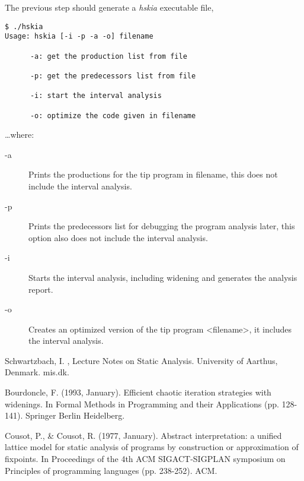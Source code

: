 \documentclass{article}
\begin{document}
The previous step should generate a \emph{hskia} executable file,
\begin{verbatim}
$ ./hskia 
Usage: hskia [-i -p -a -o] filename

      -a: get the production list from file

      -p: get the predecessors list from file

      -i: start the interval analysis
      
      -o: optimize the code given in filename 
\end{verbatim}

\ldots where:
\begin{description}
  \item[-a] Prints the productions for the tip program in filename, this does not include the interval analysis.
  \item[-p] Prints the predecessors list for debugging the program analysis later, this option also does not include the interval analysis. 
  \item[-i] Starts the interval analysis, including widening and generates the analysis report.
  \item[-o] Creates an optimized version of the tip program <filename>, it includes the interval analysis. 
\end{description}


\begin{thebibliography}{XXX}
   Schwartzbach, I. , Lecture Notes on Static Analysis. University of Aarthus, Denmark. mis\@bricks.dk.

   Bourdoncle, F. (1993, January). Efficient chaotic iteration strategies with widenings. In Formal Methods in Programming and their Applications (pp. 128-141). Springer Berlin Heidelberg.

   Cousot, P., \& Cousot, R. (1977, January). Abstract interpretation: a unified lattice model for static analysis of programs by construction or approximation of fixpoints. In Proceedings of the 4th ACM SIGACT-SIGPLAN symposium on Principles of programming languages (pp. 238-252). ACM.

\end{thebibliography}
\end{document}
